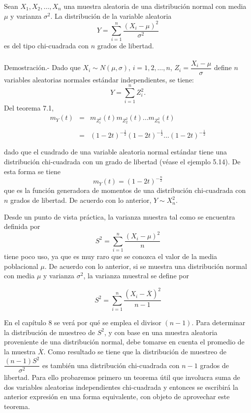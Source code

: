 \begin{teo}
    Sean $X_1,X_2,\ldots ,X_n$ una muestra aleatoria de una distribución normal con media $\mu$ y varianza $\sigma^2$. La distribución de la variable aleatoria 
    $$Y=\sum_{i=1}^n \dfrac{(X_i-\mu)^2}{\sigma^2}$$
    es del tipo chi-cuadrada con $n$ grados de libertad.\\\\
	Demostración.-\; Dado que $X_i\sim N(\mu,\sigma)$, $i=1,2,\ldots,n$, $Z_i=\dfrac{X_i-\mu}{\sigma}$ define $n$ variables aleatorias normales estándar independientes, se tiene:
	$$Y=\sum_{i=1}^n Z_i^2.$$
	Del teorema 7.1,
	$$
	\begin{array}{rcl}
	    m_Y(t)&=&m_{Z^2_i}(t)m_{Z^2_2}(t)\ldots m_{Z^2_n}(t)\\\\
		  &=& (1-2t)^{-\frac{1}{2}}(1-2t)^{-\frac{1}{2}}\ldots (1-2t)^{-\frac{1}{2}}\\\\
	\end{array}
	$$
	dado que el cuadrado de una variable aleatoria normal estándar tiene una distribución chi-cuadrada con un grado de libertad (véase el ejemplo 5.14). De esta forma se tiene
	$$m_Y(t)=(1-2t)^{-\frac{n}{2}}$$
	que es la función generadora de momentos de una distribución chi-cuadrada con $n$ grados de libertad. De acuerdo con lo anterior, $Y\sim X_n^2$.
\end{teo}

Desde un punto de vista práctica, la varianza muestra tal como se encuentra definida por 
$$S^2=\sum\limits_{i=1}^n \dfrac{(X_i-\mu)^2}{n}$$
tiene poco uso, ya que es muy raro que se conozca el valor de la media poblacional $\mu$. De acuerdo con lo anterior, si se muestra una distribución normal con media $\mu$ y varianza $\sigma^2$, la varianza muestral se define por
\begin{tcolorbox}
    $$S^2=\sum_{i=1}^n \dfrac{\left(X_i-\overline{X}\right)^2}{n-1}$$
\end{tcolorbox}
En el capítulo 8 se verá por qué se emplea el divisor $(n-1)$. Para determinar la distribución de muestreo de $S^2$, y con base en una muestra aleatoria proveniente de una distribución normal, debe tomarse en cuenta el promedio de la muestra $\overline{X}$. Como resultado se tiene que la distribución de muestreo de $\dfrac{(n-1)S^2}{\sigma^2}$ es también una distribución chi-cuadrada con $n-1$ grados de libertad. Para ello probaremos primero un teorema útil que involucra suma de dos variables aleatorias independientes chi-cuadrada y entonces se escribirá la anterior expresión en una forma equivalente, con objeto de aprovechar este teorema.


